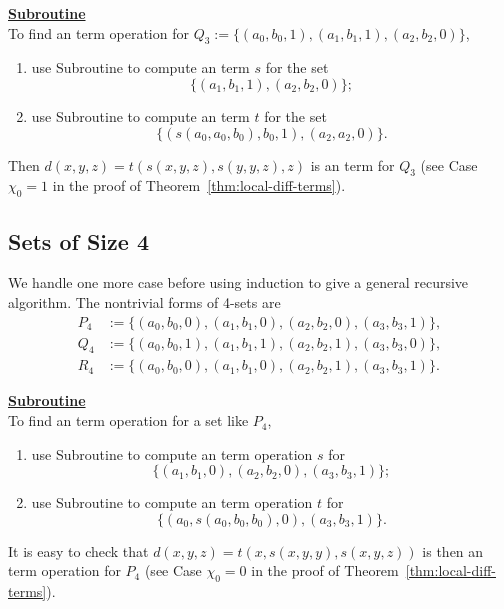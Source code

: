 \medskip

\noindent \underline{\textbf{Subroutine }}\\[4pt]
To find an \ld term operation for 
$Q_3 := \{(a_0, b_0, 1), (a_1, b_1, 1), (a_2, b_2, 0)\}$,
\begin{enumerate}
\item \label{item:001-1}
use Subroutine  to compute an \ld term $s$ for the set
\begin{equation*}
\{(a_1, b_1, 1), (a_2, b_2, 0)\};
\end{equation*}
\item \label{item:001-2} use Subroutine  to compute an \ld term $t$
for the set
\begin{equation*}
\{(s(a_0, a_0, b_0), b_0, 1),  (a_2,a_2,0)\}.
\end{equation*}
\end{enumerate}
Then 
$d(x,y,z) = t(s(x,y,z), s(y,y,z),z)$
is an \ld term  for $Q_3$ (see Case $\chi_0=1$ in the proof of Theorem~\ref{thm:local-diff-terms}).

\subsection{Sets of Size 4} We handle one more case before 
using induction to give a general recursive algorithm.
The nontrivial forms of 4-sets are
\begin{align*}
P_4 &:= \{(a_0, b_0, 0), (a_1, b_1, 0),  (a_2, b_2, 0),  (a_3, b_3, 1)\},\\ 
Q_4 &:= \{(a_0, b_0, 1), (a_1, b_1, 1), (a_2, b_2, 1), (a_3, b_3, 0)\},\\
R_4 &:= \{(a_0, b_0, 0), (a_1, b_1, 0),  (a_2, b_2, 1),  (a_3, b_3, 1)\}.
\end{align*}

\medskip

\noindent \underline{\textbf{Subroutine }}\\[4pt]
To find an \ld term operation for a set like $P_4$,
\begin{enumerate}
\item use Subroutine  to compute an \ld term operation $s$ for
\begin{equation*}
\{(a_1, b_1, 0),  (a_2, b_2, 0),  (a_3, b_3, 1)\};
\end{equation*}
\item use Subroutine  to compute an \ld term operation $t$ for
\begin{equation*}
\{(a_0, s(a_0, b_0, b_0), 0), (a_3, b_3, 1)\}.
\end{equation*}
\end{enumerate}
It is easy to check that
$d(x,y,z) = t(x, s(x,y,y), s(x,y,z))$
is then an \ld term operation for $P_4$ 
(see Case $\chi_0=0$ in the proof of Theorem~\ref{thm:local-diff-terms}).


